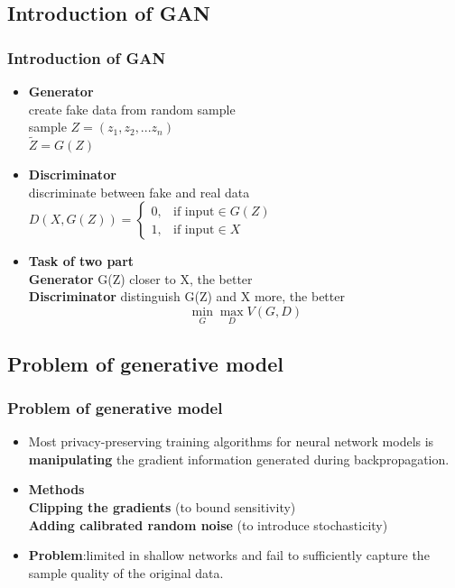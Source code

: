 \documentclass{beamer}
\begin{document}
\subsection{Introduction of GAN}
\begin{frame}
    \frametitle{Introduction of GAN}
    \begin{itemize}
        \item \textbf{Generator}\\[5pt]
        create fake data from random sample\\
        sample $Z = (z_1,z_2,...z_n)$\\
        $\tilde{Z} = G(Z)$\\
        \item \textbf{Discriminator}\\[5pt]
        discriminate between fake and real data\\
        $D(X, G(Z)) = \begin{cases}
                      0, & \mbox{if input} \in G(Z)\\
                      1, & \mbox{if input} \in X
                      \end{cases}$
        \item \textbf{Task of two part}\\[5pt]
        \textbf{Generator}
        G(Z) closer to X, the better\\
        \textbf{Discriminator}
        distinguish G(Z) and X more, the better\\
        {$$\mathop{\min}\limits_{G}\mathop{\max}\limits_{D} V(G,D)$$}
    \end{itemize}
\end{frame}

\subsection{Problem of generative model}
\begin{frame}
    \frametitle{Problem of generative model}
    \begin{itemize}
    \item Most privacy-preserving training algorithms for neural network models is \textbf{manipulating}
  the gradient information generated during backpropagation.
    \item \textbf{Methods}\\
      \textbf{Clipping the gradients} (to bound sensitivity)\\
      \textbf{Adding calibrated random noise} (to introduce stochasticity)
    \item \textbf{Problem}:limited in shallow networks and fail to sufficiently capture the sample quality of the
  original data.

  \end{itemize} 
\end{frame}
\end{document}
